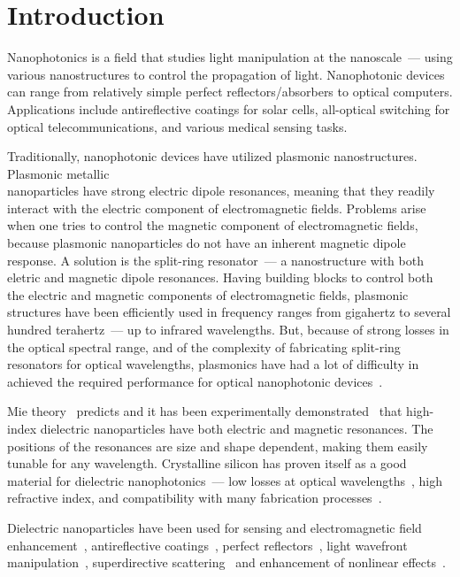 \section*{Introduction}
\label{ch:Intro}
        Nanophotonics is a field that studies light manipulation at the nanoscale~--- using various nanostructures to control the
    propagation of light. Nanophotonic devices can range from relatively simple perfect reflectors/absorbers to optical computers.
    Applications include antireflective coatings for solar cells, all-optical switching for optical telecommunications, and various
    medical sensing tasks.

        Traditionally, nanophotonic devices have utilized plasmonic nanostructures. Plasmonic metallic \\nanoparticles have strong
    electric dipole resonances, meaning that they readily interact with the electric component of electromagnetic fields. Problems arise
    when one tries to control the magnetic component of electromagnetic fields, because plasmonic nanoparticles do not have an inherent
    magnetic dipole response. A solution is the split-ring resonator~--- a nanostructure with both eletric and magnetic dipole resonances.
    Having building blocks to control both the electric and magnetic components of electromagnetic fields, plasmonic structures have been efficiently
    used in frequency ranges from gigahertz to several hundred terahertz~--- up to infrared wavelengths. But, because of strong losses
    in the optical spectral range, and of the complexity of fabricating split-ring resonators for optical wavelengths, plasmonics have
    had a lot of difficulty in achieved the required performance for optical nanophotonic devices~\cite{krasnok2015towards}.

        Mie theory~\cite{mie1908beitrage} predicts and it has been experimentally demonstrated~\cite{kuznetsov2012magnetic} that
        high-index dielectric nanoparticles have both electric and
    magnetic resonances. The positions of the resonances are size and shape dependent, making them easily tunable for any wavelength.
    Crystalline silicon has proven itself as a good material for dielectric nanophotonics~--- low losses at optical wavelengths~\cite{palik1998handbook},
    high refractive index, and compatibility with many fabrication processes~\cite{popa2008compact,zhao2009mie,evlyukhin2010optical,garcia2011strong,
    krasnok2012all,ginn2012realizing,fu2012directional,krasnok2015towards}.

        Dielectric nanoparticles have been used for sensing and electromagnetic field enhancement~\cite{albella2013low,zambrana2015purcell,
    bakker2015magnetic,caldarola2015non}, antireflective coatings~\cite{spinelli2012broadband},  perfect reflectors~\cite{evlyukhin2010optical,
    moitra2014experimental}, light wavefront manipulation~\cite{decker2015high,yu2015high}, superdirective scattering~\cite{krasnok2014superdirective,
    krasnok2014experimental} and enhancement of nonlinear effects~\cite{shcherbakov2014enhanced,makarov2015tuning}.

\clearpage
